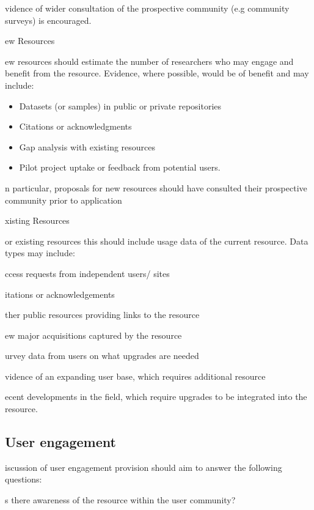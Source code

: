 \documentclass[a4paper,11point]{article}
\def\ii#1\par{{\color{blue!40}\sl #1}\par}
\def\iibf#1\par{{\color{blue!40}\sl\bfseries #1}\par}
\def\iitem#1\par{\ii\begin{itemize}[nosep]\item #1 \end{itemize}\par}
\begin{document}
\ii Evidence of wider consultation of the prospective community (e.g community 
surveys) is encouraged. 

\iibf New Resources

\ii New resources should estimate the number of researchers who may engage and benefit from the resource. Evidence, where possible, would be of benefit and may include: 
\begin{itemize}
    \item  Datasets (or samples) in public or private repositories 
    \item Citations or acknowledgments 
    \item Gap analysis with existing resources 
    \item Pilot project uptake or feedback from potential users.  
\end{itemize}

\ii In particular, proposals for new resources should have consulted their prospective community prior to application

\iibf Existing Resources

\ii For existing resources this should include usage data of the
current resource. Data types may include: 

\iitem Access requests from independent users/ sites 

\iitem Citations or acknowledgements 

\iitem Other public resources providing links to the resource 

\iitem New major acquisitions captured by the resource 

\ii{Additionally, existing resources need 
to evidence why this resource needs 
to be maintained/updated by the 
current grant. This could include: }

\iitem Survey data from users on what upgrades are needed 

\iitem Evidence of an expanding 
user base, which requires 
additional resource 

\iitem Recent developments in the 
field, which require upgrades 
to be integrated into the 
resource. 


\subsection{User engagement}
\ii Discussion of user engagement provision should aim to answer the following 
questions:

\iitem Is there awareness of the resource within the user community?
\end{document}
